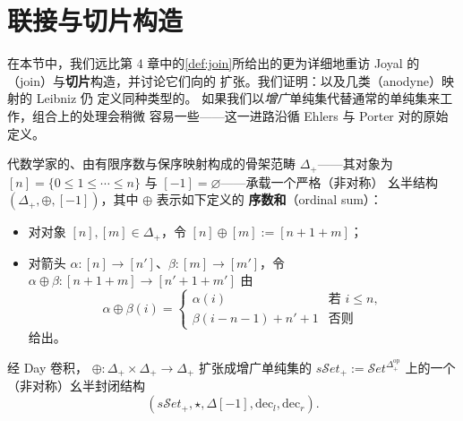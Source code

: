 
\providecommand{\sSet}{s\mathcal{S}et}%
\providecommand{\qcTwo}{\mathbf{2}}%


\section{联接与切片构造}\label{sec:the-join-and-slice-constructions}

在本节中，我们远比第 4 章中的\cref{def:join}所给出的更为详细地重访 Joyal 的%
\textbf{\trJoin}（join）与\textbf{切片}构造，并讨论它们向\trMarkedSimplicialSet{}的%
扩张。我们证明：\trMonomorphism{}以及几类\trAnodyne（anodyne）映射的 Leibniz \trJoin{}仍%
定义同种类型的\trMonomorphism。
如果我们以\emph{增广}单纯集代替通常的单纯集来工作，组合上的处理会稍微%
容易一些——这一进路沿循 Ehlers 与 Porter \cite{bib40} 对\trSimplicial\trJoin{}的原始定义。

\begin{definition}[序数和]\label{def:ordinal-sum}
代数学家的、由有限序数与保序映射构成的骨架范畴 $\Delta_{+}$——其对象为%
$[n]=\{0\le 1\le\cdots\le n\}$ 与 $[-1]=\varnothing$——承载一个严格（非对称）%
幺半结构 $(\Delta_{+},\oplus,[-1])$，其中 $\oplus$ 表示如下定义的%
\textbf{序数和}（ordinal sum）：
\begin{itemize}
\item 对对象 $[n],[m]\in\Delta_{+}$，令 $[n]\oplus[m]:=[n+1+m]$；
\item 对箭头 $\alpha\colon[n]\to[n']$、$\beta\colon[m]\to[m']$，令
$\alpha\oplus\beta\colon[n+1+m]\to[n'+1+m']$ 由
\begin{equation*}
\alpha\oplus\beta(i)=
\begin{cases}
\alpha(i) & \text{若 } i\le n,\\
\beta(i-n-1)+n'+1 & \text{否则}
\end{cases}
\end{equation*}
给出。
\end{itemize}
\end{definition}

经 Day 卷积\cite{bib33}，\trJoin\trBifunctor
$\oplus\colon\Delta_{+}\times\Delta_{+}\to\Delta_{+}$ 扩张成增广单纯集的%
\trCategory{} $\sSet_{+}:=\mathcal{S}et^{\Delta_{+}^{\mathrm{op}}}$ 上的一个%
（非对称）幺半封闭结构
\begin{equation*}
(\sSet_{+},\star,\Delta[-1],\mathrm{dec}_{l},\mathrm{dec}_{r})\mbox{.}
\end{equation*}

